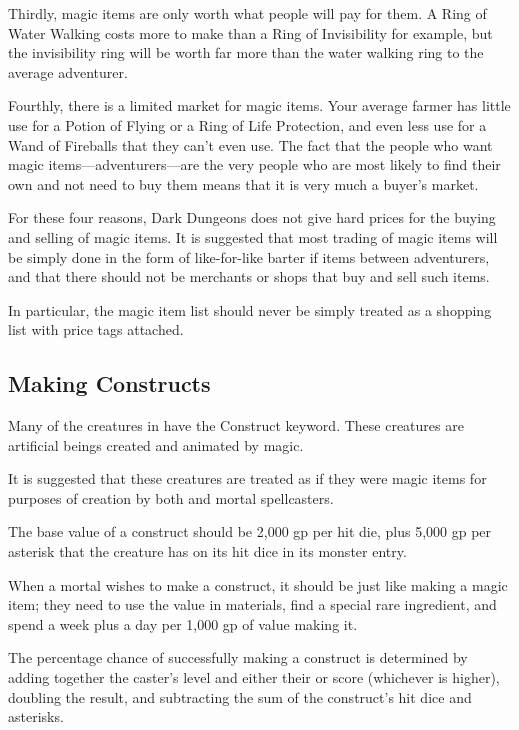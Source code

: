 \begin{multicols*}{2}
Thirdly, magic items are only worth what people will pay for them. A Ring of Water Walking costs more to make than a Ring of Invisibility for example, but the invisibility ring will be worth far more than the water walking ring to the average adventurer.

Fourthly, there is a limited market for magic items. Your average farmer has little use for a Potion of Flying or a Ring of Life Protection, and even less use for a Wand of Fireballs that they can’t even use. The fact that the people who want magic items—adventurers—are the very people who are most likely to find their own and not need to buy them means that it is very much a buyer’s market.

For these four reasons, Dark Dungeons does not give hard prices for the buying and selling of magic items. It is suggested that most trading of magic items will be simply done in the form of like-for-like barter if items between adventurers, and that there should not be merchants or shops that buy and sell such items.

In particular, the magic item list should never be simply treated as a shopping list with price tags attached.

\subsection{Making Constructs}\label{sec:Making Constructs}
Many of the creatures in  have the Construct keyword. These creatures are artificial beings created and animated by magic.

It is suggested that these creatures are treated as if they were magic items for purposes of creation by both  and mortal spellcasters.

The base value of a construct should be 2,000 gp per hit die, plus 5,000 gp per asterisk that the creature has on its hit dice in its monster entry.

When a mortal wishes to make a construct, it should be just like making a magic item; they need to use the value in materials, find a special rare ingredient, and spend a week plus a day per 1,000 gp of value making it.

The percentage chance of successfully making a construct is determined by adding together the caster’s level and either their  or  score (whichever is higher), doubling the result, and subtracting the sum of the construct’s hit dice and asterisks.


\end{multicols*}
